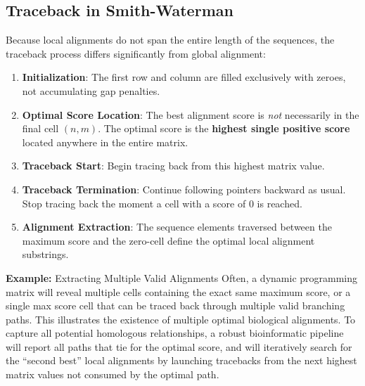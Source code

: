 \subsection{Traceback in Smith-Waterman}
Because local alignments do not span the entire length of the sequences, the traceback process differs significantly from global alignment:
\begin{enumerate}
    \item \textbf{Initialization}: The first row and column are filled exclusively with zeroes, not accumulating gap penalties.
    \item \textbf{Optimal Score Location}: The best alignment score is \textit{not} necessarily in the final cell $(n,m)$. The optimal score is the \textbf{highest single positive score} located anywhere in the entire matrix.
    \item \textbf{Traceback Start}: Begin tracing back from this highest matrix value.
    \item \textbf{Traceback Termination}: Continue following pointers backward as usual. Stop tracing back the moment a cell with a score of $0$ is reached.
    \item \textbf{Alignment Extraction}: The sequence elements traversed between the maximum score and the zero-cell define the optimal local alignment substrings.
\end{enumerate}

\textbf{Example:} Extracting Multiple Valid Alignments
Often, a dynamic programming matrix will reveal multiple cells containing the exact same maximum score, or a single max score cell that can be traced back through multiple valid branching paths.
This illustrates the existence of multiple optimal biological alignments.
To capture all potential homologous relationships, a robust bioinformatic pipeline will report all paths that tie for the optimal score, and will iteratively search for the ``second best'' local alignments by launching tracebacks from the next highest matrix values not consumed by the optimal path.

